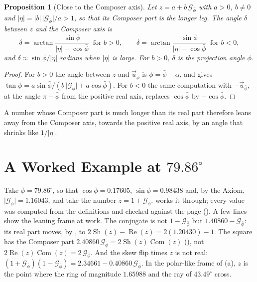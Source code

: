 \documentclass[11pt,a4paper]{amsart}
\theoremstyle{plain}
\newtheorem{proposition}[theorem]{Proposition}
\theoremstyle{definition}
\theoremstyle{remark}
\newcommand{\pb}{\bar{\phi}}                     %
\newcommand{\Gp}{\mathcal{G}_{\bar{\phi}}}       %
\newcommand{\up}{\vec{u}_{\bar{\phi}}}           %
\renewcommand{\Re}{\operatorname{Re}}            %
\DeclareMathOperator{\Com}{Com}                  %
\DeclareMathOperator{\Sh}{Sh}                    %
\begin{document}
\begin{proposition}[Close to the Composer axis]\label{prop:near-axis}
Let $z = a + b\,\Gp$ with $a > 0$, $b \neq 0$ and $\lvert\eta\rvert = \lvert b\rvert\,\lvert\Gp\rvert/a > 1$, so that its Composer part is the longer leg. The angle $\delta$ between $z$ and the Composer axis is
\[
\delta = \arctan\frac{\sin\pb}{\lvert\eta\rvert + \cos\pb} \ \text{ for } b > 0 , \qquad \delta = \arctan\frac{\sin\pb}{\lvert\eta\rvert - \cos\pb} \ \text{ for } b < 0 ,
\]
and $\delta \approx \sin\pb/\lvert\eta\rvert$ radians when $\lvert\eta\rvert$ is large. For $b > 0$, $\delta$ is the projection angle $\phi$.
\end{proposition}

\begin{proof}
For $b > 0$ the angle between $z$ and $\up$ is $\phi = \pb - \alpha$, and  gives $\tan\phi = a\sin\pb/(b\,\lvert\Gp\rvert + a\cos\pb)$. For $b < 0$ the same computation with $-\up$, at the angle $\pi - \pb$ from the positive real axis, replaces $\cos\pb$ by $-\cos\pb$.
\end{proof}

A number whose Composer part is much longer than its real part therefore leans away from the Composer axis, towards the positive real axis, by an angle that shrinks like $1/\lvert\eta\rvert$.

\section{A Worked Example at \texorpdfstring{$79.86^\circ$}{79.86 degrees}}\label{sec:example}

Take $\pb = 79.86^\circ$, so that $\cos\pb = 0.17605$, $\sin\pb = 0.98438$ and, by the Axiom, $\lvert\Gp\rvert = 1.16043$, and take the number $z = 1 + \Gp$.  works it through; every value was computed from the definitions and checked against the page (). A few lines show the leaning frame at work. The conjugate is not $1 - \Gp$ but $1.40860 - \Gp$: its real part moves, by , to $2\Sh(z) - \Re(z) = 2(1.20430) - 1$. The square has the Composer part $2.40860\,\Gp = 2\Sh(z)\Com(z)$ (), not $2\Re(z)\Com(z) = 2\,\Gp$. And the skew flip times $z$ is not real: $(1 + \Gp)(1 - \Gp) = 2.34661 - 0.40860\,\Gp$. In the polar-like frame of (a), $z$ is the point where the ring of magnitude $1.65988$ and the ray of $43.49^\circ$ cross.
\end{document}
